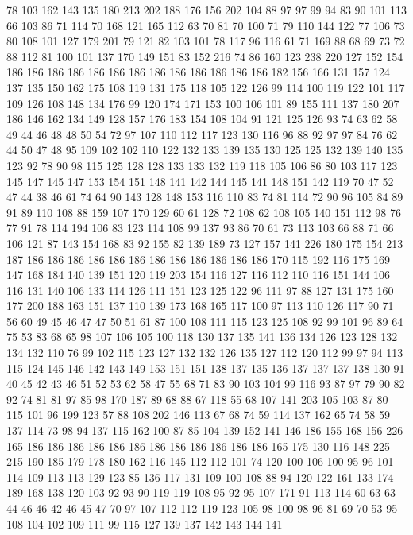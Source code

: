 78 103 162 143 135 180 213 202 188 176 156 202 104 88 97 97 99 94 83 90
101 113 66 103 86 71 114 70 168 121 165 112 63 70 81 70 100 71 79 110
144 122 77 106 73 80 108 101 127 179 201 79 121 82 103 101 78 117 96 116
61 71 169 88 68 69 73 72 88 112 81 100 101 137 170 149 151 83 152 216
74 86 160 123 238 220 127 152 154 186 186 186 186 186 186 186 186 186 186 186
186 186 182 156 166 131 157 124 137 135 150 162 175 108 119 131 175 118 105 122
126 99 114 100 119 122 101 117 109 126 108 148 134 176 99 120 174 171 153 100
106 101 89 155 111 137 180 207 186 146 162 134 149 128 157 176 183 154 108 104
91 121 125 126 93 74 63 62 58 49 44 46 48 48 50 54 72 97 107 110
112 117 123 130 116 96 88 92 97 97 84 76 62 44 50 47 48 95 109 102
102 110 122 132 133 139 135 130 125 125 132 139 140 135 123 92 78 90 98 115
125 128 128 133 133 132 119 118 105 106 86 80 103 117 123 145 147 145 147 153
154 151 148 141 142 144 145 141 148 151 142 119 70 47 52 47 44 38 46 61
74 64 90 143 128 148 153 116 110 83 74 81 114 72 90 96 105 84 89 91
89 110 108 88 159 107 170 129 60 61 128 72 108 62 108 105 140 151 112 98
76 77 91 78 114 194 106 83 123 114 108 99 137 93 86 70 61 73 113 103
66 88 71 66 106 121 87 143 154 168 83 92 155 82 139 189 73 127 157 141
226 180 175 154 213 187 186 186 186 186 186 186 186 186 186 186 186 186 170 115
192 116 175 169 147 168 184 140 139 151 120 119 203 154 116 127 116 112 110 116
151 144 106 116 131 140 106 133 114 126 111 151 123 125 122 96 111 97 88 127
131 175 160 177 200 188 163 151 137 110 139 173 168 165 117 100 97 113 110 126
117 90 71 56 60 49 45 46 47 47 50 51 61 87 100 108 111 115 123 125
108 92 99 101 96 89 64 75 53 83 68 65 98 107 106 105 100 118 130 137
135 141 136 134 126 123 128 132 134 132 110 76 99 102 115 123 127 132 132 126
135 127 112 120 112 99 97 94 113 115 124 145 146 142 143 149 153 151 151 138
137 135 136 137 137 137 138 130 91 40 45 42 43 46 51 52 53 62 58 47
55 68 71 83 90 103 104 99 116 93 87 97 79 90 82 92 74 81 81 97
85 98 170 187 89 68 88 67 118 55 68 107 141 203 105 103 87 80 115 101
96 199 123 57 88 108 202 146 113 67 68 74 59 114 137 162 65 74 58 59
137 114 73 98 94 137 115 162 100 87 85 104 139 152 141 146 186 155 168 156
226 165 186 186 186 186 186 186 186 186 186 186 186 186 165 175 130 116 148 225
215 190 185 179 178 180 162 116 145 112 112 101 74 120 100 106 100 95 96 101
114 109 113 113 129 123 85 136 117 131 109 100 108 88 94 120 122 161 133 174
189 168 138 120 103 92 93 90 119 119 108 95 92 95 107 171 91 113 114 60
63 63 44 46 46 42 46 45 47 70 97 107 112 112 119 123 105 98 100 98
96 81 69 70 53 95 108 104 102 109 111 99 115 127 139 137 142 143 144 141
